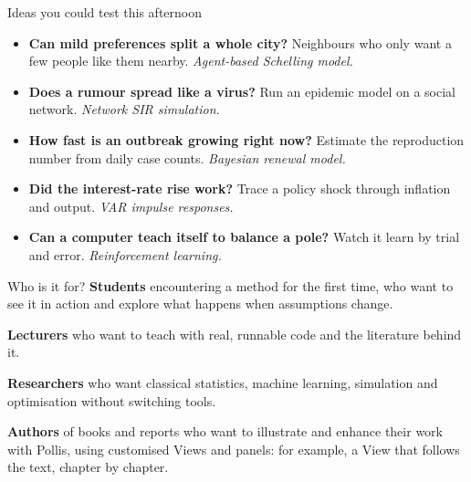 \documentclass[10pt,a4paper]{article}
\begin{document}
\vspace{2mm}
\begin{minipage}[t]{0.56\linewidth}\vspace{0pt}
\begin{pbox}{Ideas you could test this afternoon}
\begin{itemize}
  \item[\color{deepamber}\faCity] \textbf{Can mild preferences split a whole city?} Neighbours who only want a few people like them nearby.
    \emph{Agent-based Schelling model.}
  \item[\color{deepamber}\faProjectDiagram] \textbf{Does a rumour spread like a virus?} Run an epidemic model on a social network.
    \emph{Network SIR simulation.}
  \item[\color{deepamber}\faHeartbeat] \textbf{How fast is an outbreak growing right now?} Estimate the reproduction number from daily case counts.
    \emph{Bayesian renewal model.}
  \item[\color{deepamber}\faUniversity] \textbf{Did the interest-rate rise work?} Trace a policy shock through inflation and output.
    \emph{VAR impulse responses.}
  \item[\color{deepamber}\faRobot] \textbf{Can a computer teach itself to balance a pole?} Watch it learn by trial and error.
    \emph{Reinforcement learning.}
\end{itemize}
\end{pbox}
\end{minipage}\hfill
\begin{minipage}[t]{0.41\linewidth}\vspace{0pt}
\begin{pbox}{Who is it for?}
\textbf{Students} encountering a method for the first time, who want to see it in action and explore what happens when assumptions change.\par\smallskip
\textbf{Lecturers} who want to teach with real, runnable code and the literature behind it.\par\smallskip
\textbf{Researchers} who want classical statistics, machine learning, simulation and optimisation without switching tools.\par\smallskip
\textbf{Authors} of books and reports who want to illustrate and enhance their work with Pollis, using customised Views and panels: for example, a View that follows the text, chapter by chapter.
\end{pbox}
\end{minipage}
\end{document}
